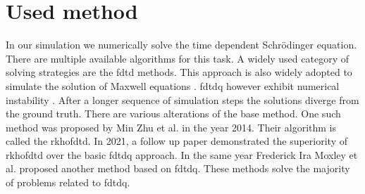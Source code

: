 \section{Used method}
\label{sec:used_method}

In our simulation we numerically solve the time dependent Schrödinger equation.
There are multiple available algorithms for this task.
A widely used category of solving strategies are the \acrfull{fdtd} methods.
This approach is also widely adopted to simulate the solution of Maxwell equations \cite{maxwell1865, Ulf2001}.
\acrfull{fdtdq} however exhibit numerical instability \cite{Soriano2004}.
After a longer sequence of simulation steps the solutions diverge from the ground truth.
There are various alterations of the base method.
One such method was proposed by Min Zhu et al. \cite{Zhu2014} in the year 2014.
Their algorithm is called the \acrfull{rkhofdtd}.
In 2021, a follow up paper \cite{Zhu_Wang_2021} demonstrated the superiority of \acrshort{rkhofdtd} over the basic \acrshort{fdtdq} approach.
In the same year Frederick Ira Moxley et al. \cite{MOXLEY20122434} proposed another method based on \acrshort{fdtdq}.
These methods solve the majority of problems related to \acrshort{fdtdq}.


